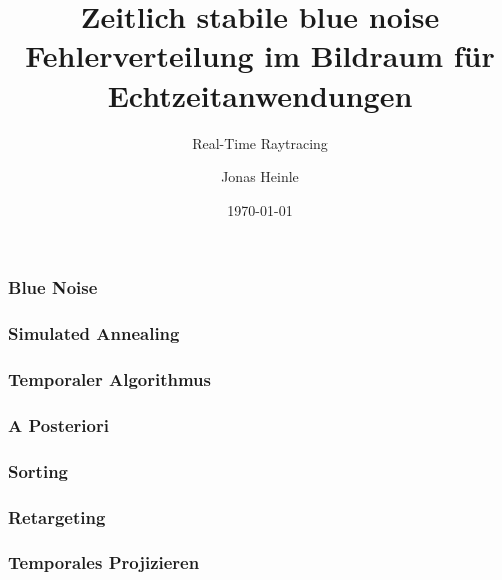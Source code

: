 \documentclass[t]{beamer}
\date{\today}
\title[]{Zeitlich stabile blue noise Fehlerverteilung im Bildraum für Echtzeitanwendungen}
\subtitle{Real-Time Raytracing}
\author[Jonas Heinle]{Jonas Heinle}
\institute[IVD - Institut für Visualisierung und Datenanalyse]{KARLSRUHER INSTITUT FÜR TECHNOLOGIE (KIT)}
\begin{document}
\begin{frame}
  \maketitle
\end{frame}

\begin{frame}
  \frametitle{Blue Noise}

  
\end{frame}

\begin{frame}
  \frametitle{Simulated Annealing}

  
\end{frame}

\begin{frame}
    \frametitle{Temporaler Algorithmus}
  
    
\end{frame}

\begin{frame}
    \frametitle{A Posteriori}
  
    
\end{frame}

\begin{frame}
    \frametitle{Sorting}
  
    
\end{frame}

\begin{frame}
    \frametitle{Retargeting}
  
    
\end{frame}

\begin{frame}
    \frametitle{Temporales Projizieren}
  
    
\end{frame}
\end{document}
